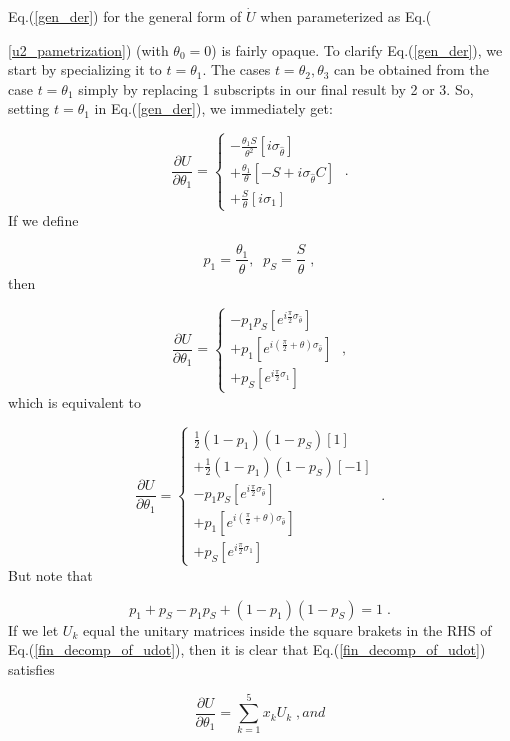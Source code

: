 \documentclass[12pt]{article}
\newcommand{\beq}{\begin{equation}}
\newcommand{\eeq}{\end{equation}}
\begin{document}
Eq.(\ref{gen_der}) for the general form of
$\dot{U}$ when parameterized
as Eq.({\ref{u2_pametrization}) (with $\theta_0=0$)
is fairly opaque.
To clarify
Eq.(\ref{gen_der}),
we start by specializing it to $t=\theta_1$.
The cases $t=\theta_2, \theta_3$
can be obtained from the case
$t=\theta_1$ simply by replacing
1 subscripts in our final result by 2 or 3.
So, setting $t=\theta_1$ in Eq.(\ref{gen_der}),
we immediately get:

\beq
\frac{\partial U}{\partial \theta_1} =
\left\{
\begin{array}{l}
-\frac{\theta_1 S}{\theta^2}
\left[i\sigma_{\hat{\theta}}\right]
\\
+
\frac{\theta_1}{\theta}
\left[-S + i\sigma_{\hat{\theta}}C\right]
\\
+
\frac{S}{\theta}
\left[i\sigma_1\right]
\end{array}
\right.
\;.
\eeq
If we define

\beq
p_1=\frac{\theta_1}{\theta},\;\;p_S = \frac{S}{\theta}
\;,
\eeq
then

\beq
\frac{\partial U}{\partial \theta_1} =
\left\{
\begin{array}{l}
-p_1p_S
\left[e^{i\frac{\pi}{2}\sigma_{\hat{\theta}}}\right]
\\
+
p_1
\left[e^{i(\frac{\pi}{2}+\theta)\sigma_{\hat{\theta}}}\right]
\\
+
p_S
\left[e^{i\frac{\pi}{2}\sigma_1}\right]
\end{array}
\right.
\;,
\eeq
which is equivalent to

\beq
\boxed{
\frac{\partial U}{\partial \theta_1} =
\left\{
\begin{array}{l}
\frac{1}{2}(1-p_1)(1-p_S)[1]
\\
+
\frac{1}{2}(1-p_1)(1-p_S)[-1]
\\
-p_1p_S
\left[e^{i\frac{\pi}{2}\sigma_{\hat{\theta}}}\right]
\\
+
p_1
\left[e^{i(\frac{\pi}{2}+\theta)\sigma_{\hat{\theta}}}\right]
\\
+
p_S
\left[e^{i\frac{\pi}{2}\sigma_1}\right]
\end{array}
\right.
\;.}
\label{fin_decomp_of_udot}
\eeq
But note that

\beq
p_1 + p_S -  p_1p_S + (1-p_1)(1-p_S) = 1
\;.
\eeq
If we let $U_k$
equal the
unitary matrices
inside the square brakets in
the RHS of Eq.(\ref{fin_decomp_of_udot}),
then it is clear that
Eq.(\ref{fin_decomp_of_udot})
satisfies

\begin{subequations}
\beq
\frac{\partial U}{\partial \theta_1}=
\sum_{k=1}^5 x_k U_k
\;,
\eeq
and


\end{subequations}}
\end{document}
